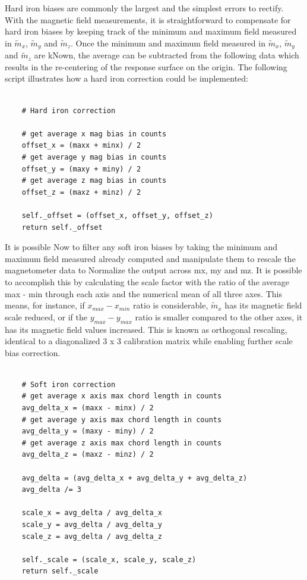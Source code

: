 Hard iron biases are commonly the largest and the simplest errors to rectify. With the magnetic field measurements, it is straightforward to compensate for hard iron biases by keeping track of the minimum and maximum field measured in $\widetilde{m}_x$, $\widetilde{m}_y$ and $\widetilde{m}_z$. Once the minimum and maximum field measured in $\widetilde{m}_x$, $\widetilde{m}_y$ and $\widetilde{m}_z$ are kNown, the average can be subtracted from the following data which results in the re-centering of the response surface on the origin. The following script illustrates how a hard iron correction could be implemented:

\lstset{language=Python}
\begin{lstlisting}[frame=single]  % Start your code-block

    # Hard iron correction

    # get average x mag bias in counts
    offset_x = (maxx + minx) / 2
    # get average y mag bias in counts
    offset_y = (maxy + miny) / 2
    # get average z mag bias in counts
    offset_z = (maxz + minz) / 2

    self._offset = (offset_x, offset_y, offset_z)
    return self._offset
\end{lstlisting}

It is possible Now to filter any soft iron biases by taking the minimum and maximum field measured already computed and manipulate them to rescale the magnetometer data to Normalize the output across mx, my and mz. It is possible to accomplish this by calculating the scale factor with the ratio of the average max - min through each axis and the numerical mean of all three axes. This means, for instance, if $x_{max} - x_{min}$ ratio is considerable, $\widetilde{m}_x$ has its magnetic field scale reduced, or if the $y_{max} - y_{max}$ ratio is smaller compared to the other axes, it has its magnetic field values increased. This is known as orthogonal rescaling, identical to a diagonalized 3 x 3 calibration matrix while enabling further scale bias correction.

\lstset{language=Python}
\begin{lstlisting}[frame=single]  % Start your code-block

    # Soft iron correction
    # get average x axis max chord length in counts
    avg_delta_x = (maxx - minx) / 2
    # get average y axis max chord length in counts
    avg_delta_y = (maxy - miny) / 2
    # get average z axis max chord length in counts
    avg_delta_z = (maxz - minz) / 2

    avg_delta = (avg_delta_x + avg_delta_y + avg_delta_z)
    avg_delta /= 3

    scale_x = avg_delta / avg_delta_x
    scale_y = avg_delta / avg_delta_y
    scale_z = avg_delta / avg_delta_z

    self._scale = (scale_x, scale_y, scale_z)
    return self._scale

\end{lstlisting}

